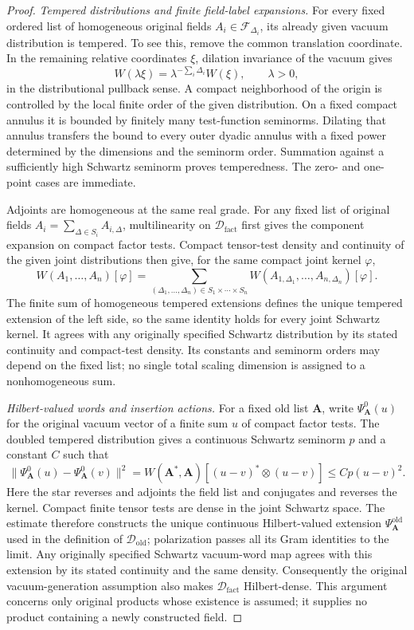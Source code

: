 \begin{proof}
\emph{Tempered distributions and finite field-label expansions.}
For every fixed ordered list of homogeneous original fields
$A_i\in\mathcal F_{\Delta_i}$, its already given vacuum distribution is
tempered. To see this, remove the common translation coordinate. In the
remaining relative coordinates $\xi$, dilation invariance of the vacuum
gives
\[
 W(\lambda\xi)=\lambda^{-\sum_i\Delta_i}W(\xi),\qquad \lambda>0,
\]
in the distributional pullback sense. A compact neighborhood of the
origin is controlled by the local finite order of the given distribution.
On a fixed compact annulus it is bounded by finitely many test-function
seminorms. Dilating that annulus transfers the bound to every outer dyadic
annulus with a fixed power determined by the dimensions and the seminorm
order. Summation against a sufficiently high Schwartz seminorm proves
temperedness. The zero- and one-point cases are immediate.

Adjoints are homogeneous at the same real grade. For any fixed list of
original fields $A_i=\sum_{\Delta\in S_i}A_{i,\Delta}$, multilinearity on
$\mathcal D_{\mathrm{fact}}$ first gives the component expansion on compact
factor tests. Compact tensor-test density and continuity of the given joint
distributions then give, for the same compact joint kernel $\varphi$,
\begin{equation}\label{F:finite-label-extension}
 W(A_1,\ldots,A_n)[\varphi]
 =\sum_{(\Delta_1,\ldots,\Delta_n)\in S_1\times\cdots\times S_n}
 W(A_{1,\Delta_1},\ldots,A_{n,\Delta_n})[\varphi].
\end{equation}
The finite sum of homogeneous tempered extensions defines the unique
tempered extension of the left side, so the same identity holds for every
joint Schwartz kernel. It agrees with any originally specified Schwartz
distribution by its stated continuity and compact-test density. Its constants
and seminorm orders may depend on the fixed list; no single total scaling
dimension is assigned to a nonhomogeneous sum.

\emph{Hilbert-valued words and insertion actions.}
For a fixed old list $\mathbf A$, write $\Psi^0_{\mathbf A}(u)$ for the
original vacuum vector of a finite sum $u$ of compact factor tests. The
doubled tempered distribution gives a continuous Schwartz seminorm $p$
and a constant $C$ such that
\[
 \|\Psi^0_{\mathbf A}(u)-\Psi^0_{\mathbf A}(v)\|^2
 =W(\mathbf A^*,\mathbf A)[(u-v)^*\otimes(u-v)]
 \le C p(u-v)^2.
\]
Here the star reverses and adjoints the field list and conjugates and
reverses the kernel. Compact finite tensor tests are dense in the joint
Schwartz space. The estimate therefore constructs the unique continuous
Hilbert-valued extension $\Psi^{\mathrm{old}}_{\mathbf A}$ used in the
definition of $\mathcal D_{\mathrm{old}}$; polarization passes all its Gram
identities to the limit. Any originally specified Schwartz vacuum-word map
agrees with this extension by its stated continuity and the same density.
Consequently the original vacuum-generation assumption also makes
$\mathcal D_{\mathrm{fact}}$ Hilbert-dense.
This argument concerns only original products whose existence is assumed;
it supplies no product containing a newly constructed field.


\end{proof}
